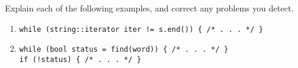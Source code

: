 %
%
\begin{question}
Explain each of the following examples, and correct any
problems you detect.
\begin{enumerate}[label=(\alph*)]
^^I\item \verb|while (string::iterator iter != s.end()) { /* . . . */ }|
^^I\item \verb|while (bool status = find(word)) { /* . . . */ }|\\
\verb|if (!status) { /* . . . */ }|
\end{enumerate}
\end{question}
